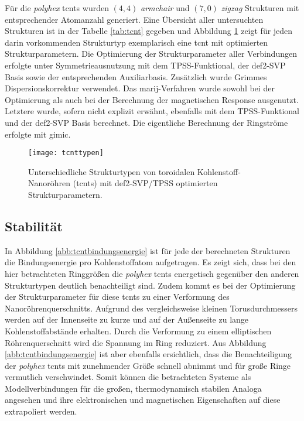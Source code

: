 Für die \textit{polyhex} \acp{tcnt} wurden $(4,4)$ \textit{armchair} und $(7,0)$ \textit{zigzag} Strukturen mit entsprechender Atomanzahl generiert. Eine Übersicht aller untersuchten Strukturen ist in der Tabelle \ref{tab:tcnt} gegeben und Abbildung \ref{abb:tcnttypen} zeigt für jeden darin vorkommenden Strukturtyp exemplarisch eine \ac{tcnt} mit optimierten Strukturparametern. Die Optimierung der Strukturparameter aller Verbindungen erfolgte unter Symmetrieausnutzung mit dem TPSS-Funktional\supercite{tao2003climbing}, der def2-SVP Basis\supercite{weigend2005balanced} sowie der entsprechenden Auxiliarbasis\supercite{weigend2006accurate}. Zusätzlich wurde Grimmes Dispersionskorrektur\supercite{grimme2010consistent,grimme2011effect} verwendet. Das \ac{marij}-Verfahren wurde sowohl bei der Optimierung\supercite{sierka2003fast} als auch bei der Berechnung der magnetischen Response\supercite{reiter2017calculation} ausgenutzt. Letztere wurde, sofern nicht explizit erwähnt, ebenfalls mit dem TPSS-Funktional und der def2-SVP Basis berechnet. Die eigentliche Berechnung der Ringströme erfolgte mit \ac{gimic}\supercite{juselius2004calculation,taubert2011calculation,fliegl2011gauge,sundholm2016calculations}.
\begin{figure}[ht!]
	\centering
	\texttt{[image: tcnttypen]}
	\captionsetup{figurewithin = chapter}
	\captionsetup{font=small, labelfont=bf}\caption[Unterschiedliche Strukturtypen von toroidalen Kohlenstoff-Nanoröhren]{Unterschiedliche Strukturtypen von toroidalen Kohlenstoff-Nanoröhren (\acp{tcnt}) mit def2-SVP/TPSS optimierten Strukturparametern.}
\label{abb:tcnttypen}
\end{figure}

\subsection{Stabilität}
In Abbildung \ref{abb:tcntbindungsenergie} ist für jede der berechneten Strukturen die Bindungsenergie pro Kohlenstoffatom aufgetragen. Es zeigt sich, dass bei den hier betrachteten Ringgrößen die \textit{polyhex} \acp{tcnt} energetisch gegenüber den anderen Strukturtypen deutlich benachteiligt sind. Zudem kommt es bei der Optimierung der Strukturparameter für diese \acp{tcnt} zu einer Verformung des Nanoröhrenquerschnitts. Aufgrund des vergleichsweise kleinen Torusdurchmessers werden auf der Innenseite zu kurze und auf der Außenseite zu lange Kohlenstoffabstände erhalten. Durch die Verformung zu einem elliptischen Röhrenquerschnitt wird die Spannung im Ring reduziert. Aus Abbildung \ref{abb:tcntbindungsenergie} ist aber ebenfalls ersichtlich, dass die Benachteiligung der \textit{polyhex} \acp{tcnt} mit zunehmender Größe schnell abnimmt und für große Ringe vermutlich verschwindet. Somit können die betrachteten Systeme als Modellverbindungen für die großen, thermodynamisch stabilen Analoga angesehen und ihre elektronischen und magnetischen Eigenschaften auf diese extrapoliert werden.

